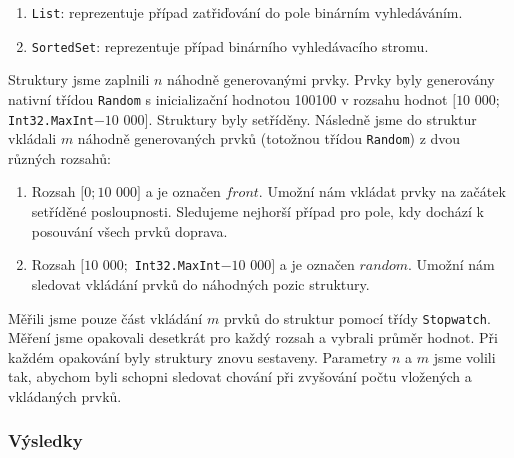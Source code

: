 \begin{enumerate}
\item \texttt{List}: reprezentuje případ zatřiďování do pole binárním vyhledáváním.
\item \texttt{SortedSet}: reprezentuje případ binárního vyhledávacího stromu.
\end{enumerate}
Struktury jsme zaplnili $n$ náhodně generovanými prvky.
Prvky byly generovány nativní třídou \texttt{Random} s inicializační hodnotou 100100 v rozsahu hodnot $[10$ 000; \texttt{Int32.MaxInt}$ - 10$ $000]$.
Struktury byly setříděny.
Následně jsme do struktur vkládali $m$ náhodně generovaných prvků (totožnou třídou \texttt{Random}) z dvou různých rozsahů:

\begin{enumerate}
\item Rozsah $[0; 10$ $000]$ a je označen $front$. 
Umožní nám vkládat prvky na začátek setříděné posloupnosti. 
Sledujeme nejhorší případ pro pole, kdy dochází k posouvání všech prvků doprava.
\item Rozsah $[10$ $000;$ \texttt{Int32.MaxInt}$ - 10$ $000]$ a je označen $random$.
Umožní nám sledovat vkládání prvků do náhodných pozic struktury.
\end{enumerate}
Měřili jsme pouze část vkládání $m$ prvků do struktur pomocí třídy \texttt{Stopwatch}.
Měření jsme opakovali desetkrát pro každý rozsah a vybrali průměr hodnot.
Při každém opakování byly struktury znovu sestaveny.
Parametry $n$ a $m$ jsme volili tak, abychom byli schopni sledovat chování při zvyšování počtu vložených a vkládaných prvků. 

\subsubsection{Výsledky}



